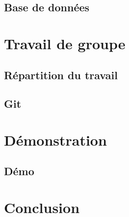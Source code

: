 \documentclass{beamer}
\begin{document}
	    \subsection{Base de données}
	        
	        
    
    \section{Travail de groupe}
        \subsection{Répartition du travail} 
	        
	        
	    \subsection{Git} %
	        
	            
	
	  \section{Démonstration}
        \subsection{Démo}
	        	        
	        
        	
    \section{Conclusion}
        \subsection{}
            
\end{document}
